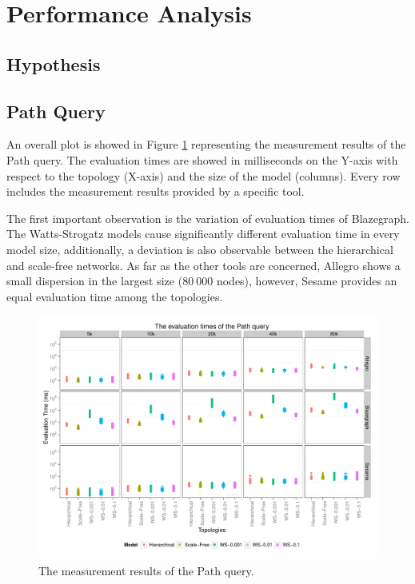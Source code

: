 \section{Performance Analysis}

\subsection{Hypothesis}

\subsection{Path Query}

An overall plot is showed in Figure \ref{fig:query1} representing the measurement results of the \textsf{Path} query. The evaluation times are showed in milliseconds on the Y-axis with respect to the topology (X-axis) and the size of the model (columns). Every row includes the measurement results provided by a specific tool.

The first important observation is the variation of evaluation times of Blazegraph. The Watts-Strogatz models cause significantly different evaluation time in every model size, additionally, a deviation is also observable between the hierarchical and scale-free networks. As far as the other tools are concerned, Allegro shows a small dispersion in the largest size ($80~000$ nodes), however, Sesame provides an equal evaluation time among the topologies. 

\begin{figure}[!ht]
	\centering
	\includegraphics[width=160mm, keepaspectratio]{figures/query1_all.pdf}
	\caption{The measurement results of the Path query.}
	\label{fig:query1}
\end{figure}


